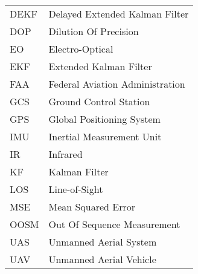 %
%
%
%

\begin{acronyms}

\renewcommand{\arraystretch}{1.5}
\setlength{\tabcolsep}{3mm}
{\begin {tabular}{ll}
DEKF  &Delayed Extended Kalman Filter\\
DOP   &Dilution Of Precision \\
EO	  &Electro-Optical \\
EKF   &Extended Kalman Filter\\
FAA   &Federal Aviation Administration \\
GCS   &Ground Control Station \\
GPS   &Global Positioning System \\
IMU   &Inertial Measurement Unit \\
IR    &Infrared \\
KF   &Kalman Filter\\
LOS  &Line-of-Sight\\
MSE   &Mean Squared Error \\
OOSM  &Out Of Sequence Measurement \\
UAS  &Unmanned Aerial System\\
UAV  &Unmanned Aerial Vehicle\\



\end {tabular}}

\end{acronyms}
